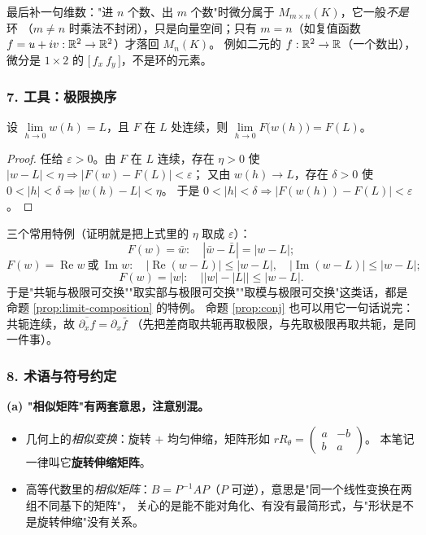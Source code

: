 \smallskip
\noindent
最后补一句维数："进 $n$ 个数、出 $m$ 个数"时微分属于 $M_{m\times n}(K)$，它一般\emph{不是}环
（$m\neq n$ 时乘法不封闭），只是向量空间；只有 $m=n$（如复值函数 $f=u+iv:\mathbb{R}^2\to\mathbb{R}^2$）才落回 $M_n(K)$。
例如二元的 $f:\mathbb{R}^2\to\mathbb{R}$（一个数出），微分是 $1\times2$ 的 $\bigl[\,f_x\ f_y\,\bigr]$，不是环的元素。

\subsubsection*{7. 工具：极限换序}

\begin{proposition}[复合函数的极限]\label{prop:limit-composition}
设 $\lim\limits_{h\to0}w(h)=L$，且 $F$ 在 $L$ 处连续，则 $\lim\limits_{h\to0}F\bigl(w(h)\bigr)=F(L)$。
\end{proposition}

\begin{proof}
任给 $\varepsilon>0$。由 $F$ 在 $L$ 连续，存在 $\eta>0$ 使 $|w-L|<\eta\Rightarrow|F(w)-F(L)|<\varepsilon$；
又由 $w(h)\to L$，存在 $\delta>0$ 使 $0<|h|<\delta\Rightarrow|w(h)-L|<\eta$。
于是 $0<|h|<\delta\Rightarrow|F(w(h))-F(L)|<\varepsilon$。
\end{proof}

\noindent
三个常用特例（证明就是把上式里的 $\eta$ 取成 $\varepsilon$）：
\[
F(w)=\bar w:\quad|\bar w-\bar L|=|w-L|;
\]
\[
F(w)=\operatorname{Re}w\ \text{或}\ \operatorname{Im}w:\quad|\operatorname{Re}(w-L)|\le|w-L|,\quad
|\operatorname{Im}(w-L)|\le|w-L|;
\]
\[
F(w)=|w|:\quad\bigl||w|-|L|\bigr|\le|w-L| .
\]
于是"共轭与极限可交换""取实部与极限可交换""取模与极限可交换"这类话，都是命题 \ref{prop:limit-composition} 的特例。
命题 \ref{prop:conj} 也可以用它一句话说完：共轭连续，故 $\overline{\partial_x f}=\partial_x\bar f$
（先把差商取共轭再取极限，与先取极限再取共轭，是同一件事）。

\subsubsection*{8. 术语与符号约定}

\noindent\textbf{(a) "相似矩阵"有两套意思，注意别混。}
\begin{itemize}[leftmargin=1.6em]
\item 几何上的\emph{相似变换}：旋转 $+$ 均匀伸缩，矩阵形如 $rR_\theta=\begin{pmatrix}a&-b\\ b&a\end{pmatrix}$。
本笔记一律叫它\textbf{旋转伸缩矩阵}。
\item 高等代数里的\emph{相似矩阵}：$B=P^{-1}AP$（$P$ 可逆），意思是"同一个线性变换在两组不同基下的矩阵"，
关心的是能不能对角化、有没有最简形式，与"形状是不是旋转伸缩"没有关系。
\end{itemize}


